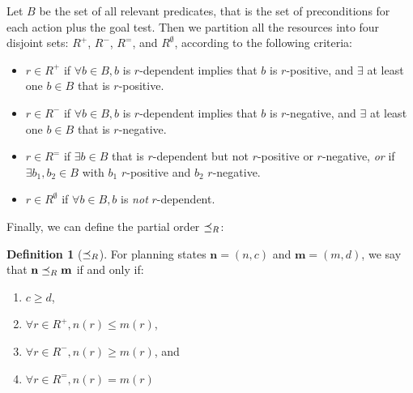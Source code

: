\documentclass[letterpaper]{article}
\theoremstyle{plain} \newtheorem{theorem}{Theorem} \newtheorem{proposition}{Proposition} \newtheorem{lemma}{Lemma}
\theoremstyle{definition} \newtheorem{definition}{Definition} \newtheorem{conjecture}{Conjecture} \newtheorem*{example}{Example}
\theoremstyle{remark} \newtheorem*{remark}{Remark} \newtheorem*{note}{Note} \newtheorem{case}{Case}
\begin{document}
Let $B$ be the set of all relevant predicates, that is the set of preconditions for each action plus the goal test. Then we partition all the resources into four disjoint sets: $R^+$, $R^-$, $R^=$, and $R^\emptyset$, according to the following criteria:
\begin{itemize}
	\item $r \in R^+$ if $\forall b \in B, b$ is $r$-dependent implies that $b$ is $r$-positive, and $\exists$ at least one $b \in B$ that is $r$-positive.
	\item $r \in R^-$ if $\forall b \in B, b$ is $r$-dependent implies that $b$ is $r$-negative, and $\exists$ at least one $b \in B$ that is $r$-negative.
	\item $r \in R^=$ if $\exists b \in B$ that is $r$-dependent but not $r$-positive or $r$-negative, \emph{or} if $\exists b_1, b_2 \in B$ with $b_1$ $r$-positive and $b_2$ $r$-negative.
	\item $r \in R^\emptyset$ if $\forall b \in B, b$ is \emph{not} $r$-dependent.
\end{itemize}

Finally, we can define the partial order $\preceq_R$:
\begin{definition}[$\preceq_R$]
	\label{def-po}
	For planning states $\mathbf{n} = (n, c)$ and $\mathbf{m} = (m, d)$, we say that $\mathbf{n} \preceq_R \mathbf{m}$ if and only if:
	\begin{enumerate}
		\item $c \ge d$,
		\item $\forall r \in R^+, n(r) \le m(r)$,
		\item $\forall r \in R^-, n(r) \ge m(r)$, and
		\item $\forall r \in R^=, n(r) = m(r)$
	\end{enumerate}
\end{definition}
\end{document}
